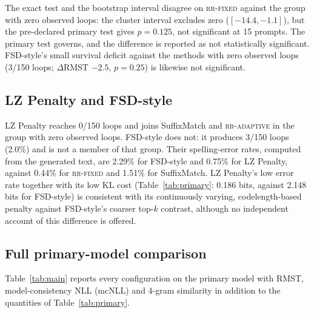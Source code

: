 \documentclass[make,article,submit,pdftex]{Definitions/mdpi}
\begin{document}
The exact test and the bootstrap interval disagree on \textsc{rr-fixed} against the group with zero observed loops: the cluster interval excludes zero ($[-14.4,-1.1]$), but the pre-declared primary test gives $p{=}0.125$, not significant at 15 prompts. The primary test governs, and the difference is reported as not statistically significant. FSD-style's small survival deficit against the methods with zero observed loops (3/150 loops; $\Delta$RMST $-2.5$, $p{=}0.25$) is likewise not significant.

\subsection{LZ Penalty and FSD-style}
\label{ssec:results-fsd-lz}
LZ Penalty reaches 0/150 loops and joins SuffixMatch and \textsc{rr-adaptive} in the group with zero observed loops. FSD-style does not: it produces 3/150 loops (2.0\%) and is not a member of that group. Their spelling-error rates, computed from the generated text, are 2.29\% for FSD-style and 0.75\% for LZ Penalty, against 0.44\% for \textsc{rr-fixed} and 1.51\% for SuffixMatch. LZ Penalty's low error rate together with its low KL cost (Table~\ref{tab:primary}: 0.186 bits, against 2.148 bits for FSD-style) is consistent with its continuously varying, codelength-based penalty against FSD-style's coarser top-$k$ contrast, although no independent account of this difference is offered.



\subsection{Full primary-model comparison}\label{ssec:fullmain}
Table~\ref{tab:main} reports every configuration on the primary model with RMST, model-consistency NLL (mcNLL) and 4-gram similarity in addition to the quantities of Table~\ref{tab:primary}.
\end{document}
